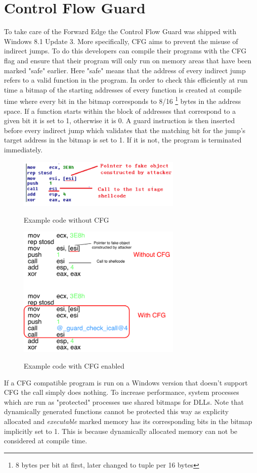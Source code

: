 \documentclass[10pt,twocolumn,a4paper]{article}
\begin{document}
\section{Control Flow Guard}\label{CFG}
To take care of the Forward Edge the Control Flow Guard was shipped with Windows 8.1 Update 3.
More specifically, CFG aims to prevent the misuse of indirect jumps.
To do this developers can compile their programs with the CFG flag and ensure that their program will only run on memory areas that have been marked "safe" earlier.
Here "safe" means that the address of every indirect jump refers to a valid function in the program.
In order to check this efficiently at run time a bitmap of the starting addresses of every function is created at compile time where every bit in the bitmap corresponds to 8/16 \footnote{8 bytes per bit at first, later changed to tuple per 16 bytes} bytes in the address space.
If a function starts within the block of addresses that correspond to a given bit it is set to 1, otherwise it is 0.
A guard instruction is then inserted before every indirect jump which validates that the matching bit for the jump's target address in the bitmap is set to 1. If it is not, the program is terminated immediately.
\begin{figure}
	\includegraphics[keepaspectratio,width=8cm]{fig/nocfg}
	\caption{Example code without CFG\cite{cfgexplore}}
	\includegraphics[keepaspectratio,width=8cm]{fig/cfg}
	\caption{Example code with CFG enabled}\cite{cfgexplore}
\end{figure}
If a CFG compatible program is run on a Windows version that doesn't support CFG the call simply does nothing.
To increase performance, system processes which are run as "protected" processes use shared bitmaps for DLLs.
Note that dynamically generated functions cannot be protected this way as explicity allocated and \emph{executable} marked memory has its corresponding bits in the bitmap implicitly set to 1.
This is because dynamically allocated memory can not be considered at compile time.
\end{document}

